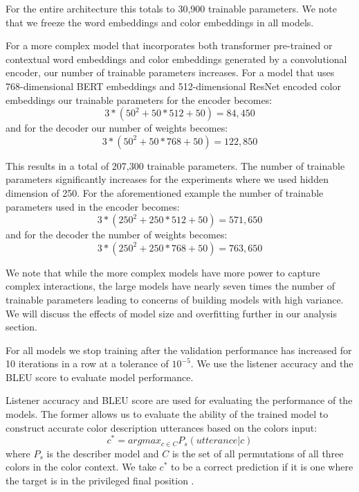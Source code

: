 For the entire architecture this totals to 30,900 trainable parameters. We note that we freeze the word embeddings and color embeddings in all models.

\par
For a more complex model that incorporates both transformer pre-trained or contextual word embeddings and color embeddings generated by a convolutional encoder, our number of trainable parameters increases. For a model that uses 768-dimensional BERT embeddings and 512-dimensional ResNet encoded color embeddings our trainable parameters for the encoder becomes:
\begin{equation}
  3*(50^2 + 50*512 +50) = 84,450
\end{equation}
and for the decoder our number of weights becomes:
\begin{equation}
  3*(50^2 + 50*768 +50) = 122,850
\end{equation}

\par
This results in a total of 207,300 trainable parameters. The number of trainable parameters significantly increases for the experiments where we used hidden dimension of 250. For the aforementioned example the number of trainable parameters used in the encoder becomes:
\begin{equation}
  3*(250^2 + 250*512 +50) = 571,650
\end{equation}
and for the decoder the number of weights becomes:
\begin{equation}
  3*(250^2 + 250*768 +50) = 763,650
\end{equation}

\par
We note that while the more complex models have more power to capture complex interactions, the large models have nearly seven times the number of trainable parameters leading to concerns of building models with high variance. We will discuss the effects of model size and overfitting further in our analysis section.

\par
For all models we stop training after the validation performance has increased for 10 iterations in a row at a tolerance of \(10^{-5}\). We use the listener accuracy and the BLEU score to evaluate model performance.

\par
Listener accuracy and BLEU score are used for evaluating the performance of the models. The former allows us to evaluate the ability of the trained model to construct accurate color description utterances based on the colors input:
\begin{equation}
  c^{*} = argmax_{c \in C} P_{s} (utterance | c)
\end{equation}
where \(P_{s}\) is the describer model and \(C\) is the set of all permutations of all three colors in the color context. We take \(c^{*}\) to be a correct prediction if it is one where the target is in the privileged final position \citep{potts-2020-colors}.

